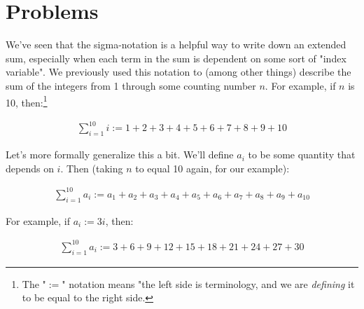 \newpage
\section{Problems}




\begin{problem}
\label{defining-sigma}





We've seen that the sigma-notation is a helpful way to write down an extended sum, especially when each term in the sum is dependent on some sort of "index variable". We previously used this notation to (among other things) describe the sum of the integers from 1 through some counting number $n$. For example, if $n$ is 10, then:\footnote{The "$:=$" notation means "the left side is terminology, and we are \emph{defining} it to be equal to the right side.}

\begin{align*}
\sum_{i=1}^{10} i := 1 + 2 + 3 + 4 + 5 + 6 + 7 + 8 + 9 + 10 
\end{align*}

Let's more formally generalize this a bit. We'll define $a_i$ to be some quantity that depends on $i$. Then (taking $n$ to equal 10 again, for our example):

\begin{align*}
\sum_{i=1}^{10} a_i := a_1 + a_2 + a_3 + a_4 + a_5 + a_6 + a_7 + a_8 + a_9 + a_{10}
\end{align*}

For example, if $a_i := 3i$, then:

\begin{align*}
\sum_{i=1}^{10} a_i := 3 + 6 + 9 + 12 + 15 + 18 + 21 + 24 + 27 + 30
\end{align*}


\end{problem}
